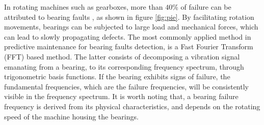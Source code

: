 \documentclass[../Main/thesis.tex]{subfiles}
\begin{document}
\justify
In rotating machines such as gearboxes, more than $40 \% $ of failure can be attributed to bearing faults \cite{albrecht1986}, as shown in figure \ref{fig:pie}. By facilitating rotation movements, bearings can be subjected to large load and mechanical forces, which can lead to slowly propagating defects. The most commonly applied method in predictive maintenance for bearing faults detection, is a Fast Fourier Transform (FFT) based method. The latter consists of decomposing a vibration signal emanating from a bearing, to its corresponding frequency spectrum, through trigonometric basis functions. If the bearing exhibits signs of failure, the fundamental frequencies, which are the failure frequencies, will be consistently visible in the frequency spectrum. It is worth noting that, a bearing failure frequency is derived from its physical characteristics, and depends on the rotating speed of the machine housing the bearings.
\end{document}
